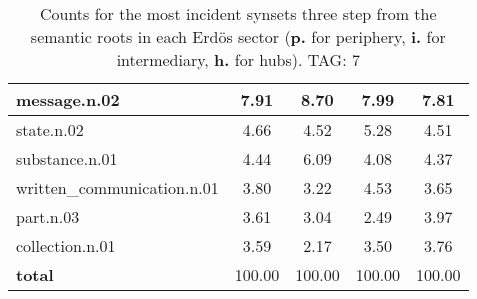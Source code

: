 \begin{table}[h!]
\begin{center}
\begin{tabular}{| l || c | c | c | c |}
message.n.02 & 7.91  & 8.70  & 7.99  & 7.81 \\\hline
state.n.02 & 4.66  & 4.52  & 5.28  & 4.51 \\\hline
substance.n.01 & 4.44  & 6.09  & 4.08  & 4.37 \\\hline
written\_communication.n.01 & 3.80  & 3.22  & 4.53  & 3.65 \\\hline
part.n.03 & 3.61  & 3.04  & 2.49  & 3.97 \\\hline
collection.n.01 & 3.59  & 2.17  & 3.50  & 3.76 \\\hline\hline
{{\bf total}} & 100.00  & 100.00  & 100.00  & 100.00 \\\hline
\end{tabular}
\caption{Counts for the most incident synsets three step from the semantic roots in each Erd\"os sector ({\bf p.} for periphery, {\bf i.} for intermediary, {\bf h.} for hubs). TAG: 7}
\end{center}
\end{table}